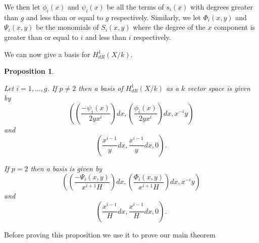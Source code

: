 \documentclass[draft, 11pt]{article} %
\theoremstyle{plain}
\newtheorem{prop}[defn]{Proposition}
\theoremstyle{remark}
\begin{document}
We then let $\phi_i(x)$ and $\psi_i(x)$ be all the terms of $s_i(x)$ with degrees greater than $g$ and less than or equal to $g$ respectively.
Similarly, we let $\Phi_i(x,y)$ and $\Psi_i(x,y)$ be the monomials of $S_i(x,y)$ where the degree of the $x$ component is greater than or equal to $i$ and less than $i$ respectively.

We can now give a basis for $H^1_{dR}(X/k)$.\\

\begin{prop}\label{basis}

Let $i=1,\ldots, g$. If $p\neq 2$ then a basis of $H^1_{dR}(X/k)$ as a $k$ vector space is given by
\begin{equation}\label{one}
 \left( \left( \frac{-\psi_i(x)}{2yx^i}\right) dx, \left(\frac{\phi_i(x)}{2yx^i}\right) dx, x^{-i}y\right)
\end{equation}
and
\begin{equation}\label{two}
 \left( \frac{x^{i-1}}{y} dx , \frac{x^{i-1}}{y} dx, 0 \right).
\end{equation}

If $p=2$ then a basis is given by
\begin{equation}\label{three}
\left( \left(\frac{-\Psi_i(x,y)}{x^{i+1}H}\right) dx, \left( \frac{\Phi_i(x,y)}{x^{i+1}H} \right) dx, x^{-i}y \right)
\end{equation}
and
\begin{equation}\label{four}
 \left( \frac{x^{i-1}}{H} dx, \frac{x^{i-1}}{H} dx, 0 \right).
\end{equation}

\end{prop}

Before proving this proposition we use it to prove our main theorem\\
\end{document}
